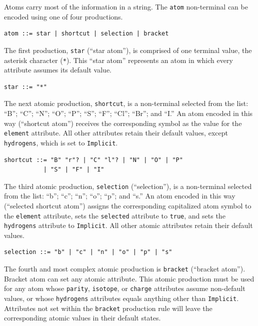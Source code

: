 \documentclass{article}
\def\ttt{\texttt}
\begin{document}
Atoms carry most of the information in a string. The \ttt{atom} non-terminal can be encoded using one of four productions.

\begin{lstlisting}
atom ::= star | shortcut | selection | bracket
\end{lstlisting}

The first production, \ttt{star} (\enquote{star atom}), is comprised of one terminal value, the asterisk character (\ttt{*}). This \enquote{star atom} represents an atom in which every attribute assumes its default value.

\begin{lstlisting}
star ::= "*"
\end{lstlisting}

The next atomic production, \ttt{shortcut},  is a non-terminal selected from the list: \enquote{B}; \enquote{C}; \enquote{N}; \enquote{O}; \enquote{P}; \enquote{S}; \enquote{F}; \enquote{Cl}; \enquote{Br}; and \enquote{I.} An atom encoded in this way (\enquote{shortcut atom}) receives the corresponding symbol as the value for the \ttt{element} attribute. All other attributes retain their default values, except \ttt{hydrogens}, which is set to \ttt{Implicit}.

\begin{lstlisting}
shortcut ::= "B" "r"? | "C" "l"? | "N" | "O" | "P"
           | "S" | "F" | "I"
\end{lstlisting}

The third atomic production, \ttt{selection} (\enquote{selection}), is a non-terminal selected from the list: \enquote{b}; \enquote{c}; \enquote{n}; \enquote{o}; \enquote{p}; and \enquote{s.} An atom encoded in this way (\enquote{selected shortcut atom}) assigns the corresponding capitalized atom symbol to the \ttt{element} attribute, sets the \ttt{selected} attribute to \ttt{true}, and sets the \ttt{hydrogens} attribute to \ttt{Implicit}. All other atomic attributes retain their default values.

\begin{lstlisting}
selection ::= "b" | "c" | "n" | "o" | "p" | "s"
\end{lstlisting}

The fourth and most complex atomic production is \ttt{bracket} (\enquote{bracket atom}). Bracket atom can set any atomic attribute. This atomic production must be used for any atom whose \ttt{parity}, \ttt{isotope}, or \ttt{charge} attributes assume non-default values, or whose \ttt{hydrogens} attributes equals anything other than \ttt{Implicit}. Attributes not set within the \ttt{bracket} production rule will leave the corresponding atomic values in their default states.
\end{document}
